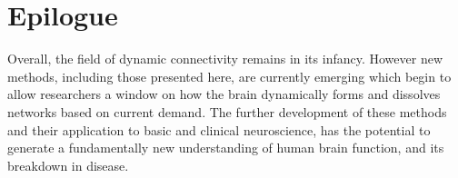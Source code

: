 \section{Epilogue}
Overall, the field of dynamic connectivity remains in its infancy. However new methods, including those presented here, are currently emerging which begin to allow researchers a window on how the brain dynamically forms and dissolves networks based on current demand. The further development of these methods and their application to basic and clinical neuroscience, has the potential to generate a fundamentally new understanding of human brain function, and its breakdown in disease.  